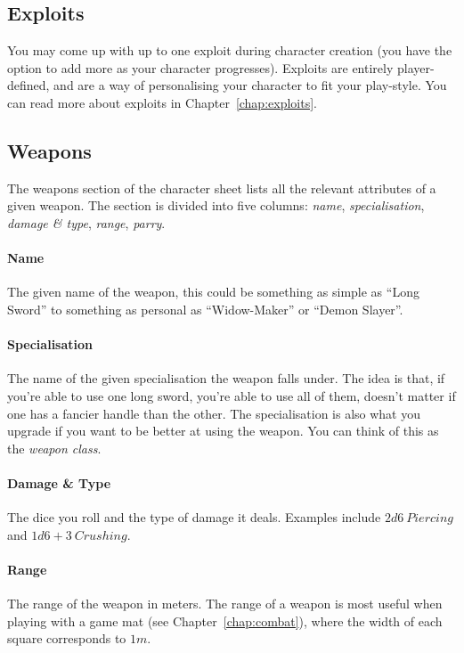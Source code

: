 \subsection{Exploits}
You may come up with up to one exploit during character creation (you have the option to add more as your character progresses).
Exploits are entirely player-defined, and are a way of personalising your character to fit your play-style.
You can read more about exploits in Chapter~\ref{chap:exploits}.

\subsection{Weapons}
The weapons section of the character sheet lists all the relevant attributes of a given weapon.
The section is divided into five columns: \textit{name}, \textit{specialisation}, \textit{damage \& type}, \textit{range}, \textit{parry}.

\paragraph{Name} The given name of the weapon, this could be something as simple as ``Long Sword'' to something as personal as ``Widow-Maker'' or ``Demon Slayer''.

\paragraph{Specialisation} The name of the given specialisation the weapon falls under.
The idea is that, if you're able to use one long sword, you're able to use all of them, doesn't matter if one has a fancier handle than the other. 
The specialisation is also what you upgrade if you want to be better at using the weapon.
You can think of this as the \textit{weapon class}.

\paragraph{Damage \& Type} The dice you roll and the type of damage it deals.
Examples include $2d6\ \mathit{Piercing}$ and $1d6+3\ \mathit{Crushing}$.

\paragraph{Range} The range of the weapon in meters.
The range of a weapon is most useful when playing with a game mat (see Chapter~\ref{chap:combat}), where the width of each square corresponds to $1m$.

